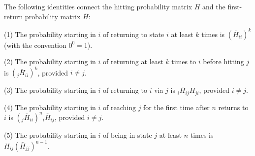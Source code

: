 The following identities connect the hitting probability matrix $H$ and the first-return probability matrix $\bar{H}$:

(1) The probability starting in $i$ of returning to state $i$ at least $k$ times is $(\bar{H}_{ii})^k$ (with the convention $0^0 = 1$).

(2) The probability starting in $i$ of returning at least $k$ times to $i$ before hitting $j$ is $({}_j\bar{H}_{ii})^k$, provided $i \neq j$.

(3) The probability starting in $i$ of returning to $i$ via $j$ is ${}_i\bar{H}_{ij}H_{ji}$, provided $i \neq j$.

(4) The probability starting in $i$ of reaching $j$ for the first time after $n$ returns to $i$ is $({}_j\bar{H}_{ii})^n {}_i\bar{H}_{ij}$, provided $i \neq j$.

(5) The probability starting in $i$ of being in state $j$ at least $n$ times is $H_{ij}(\bar{H}_{jj})^{n-1}$.
